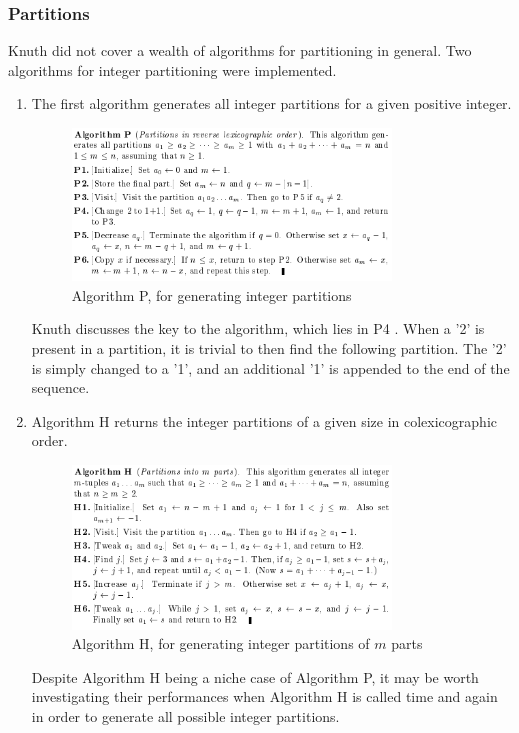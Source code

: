 \documentclass[12pt]{article}
\begin{document}
\pagebreak
\subsubsection{Partitions}
Knuth did not cover a wealth of algorithms for partitioning in general. Two algorithms for integer partitioning were implemented. 

\begin{enumerate}
\item The first algorithm generates all integer partitions for a given positive integer.

\begin{figure}[h]
\centering
\includegraphics[width=0.8\textwidth]{images/int_part_P.PNG}
\caption{Algorithm P, for generating integer partitions \cite{int_part_P}}
\end{figure}

Knuth discusses the key to the algorithm, which lies in P4 \cite{int_part_P}. When a '2' is present in a partition, it is trivial to then find the following partition. The '2' is simply changed to a '1', and an additional '1' is appended to the end of the sequence.

\pagebreak


\item Algorithm H returns the integer partitions of a given size in colexicographic order.

\begin{figure}[h]
\centering
\includegraphics[width=0.8\textwidth]{images/int_part_H.PNG}
\caption{Algorithm H, for generating integer partitions of \(m\) parts \cite{int_part_H}}
\end{figure}

Despite Algorithm H being a niche case of Algorithm P, it may be worth investigating their performances when Algorithm H is called time and again in order to generate all possible integer partitions.

\end{enumerate}
\end{document}
